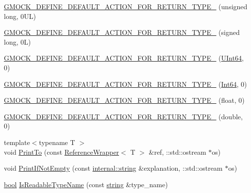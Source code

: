 \begin{DoxyCompactItemize}
\item 
\hyperlink{namespacetesting_1_1internal_a1f4167b954a7ff0074ce8a5bb855f86f}{G\+M\+O\+C\+K\+\_\+\+D\+E\+F\+I\+N\+E\+\_\+\+D\+E\+F\+A\+U\+L\+T\+\_\+\+A\+C\+T\+I\+O\+N\+\_\+\+F\+O\+R\+\_\+\+R\+E\+T\+U\+R\+N\+\_\+\+T\+Y\+P\+E\+\_\+} (unsigned long, 0\+U\+L)
\item 
\hyperlink{namespacetesting_1_1internal_ad8804e25537427755c324ab03a72e776}{G\+M\+O\+C\+K\+\_\+\+D\+E\+F\+I\+N\+E\+\_\+\+D\+E\+F\+A\+U\+L\+T\+\_\+\+A\+C\+T\+I\+O\+N\+\_\+\+F\+O\+R\+\_\+\+R\+E\+T\+U\+R\+N\+\_\+\+T\+Y\+P\+E\+\_\+} (signed long, 0\+L)
\item 
\hyperlink{namespacetesting_1_1internal_ad2efcdbd12c7c020745b87bcc0997809}{G\+M\+O\+C\+K\+\_\+\+D\+E\+F\+I\+N\+E\+\_\+\+D\+E\+F\+A\+U\+L\+T\+\_\+\+A\+C\+T\+I\+O\+N\+\_\+\+F\+O\+R\+\_\+\+R\+E\+T\+U\+R\+N\+\_\+\+T\+Y\+P\+E\+\_\+} (\hyperlink{namespacetesting_1_1internal_aa6a1ac454e6d7e550fa4925c62c35caa}{U\+Int64}, 0)
\item 
\hyperlink{namespacetesting_1_1internal_ab427739121a380a7934bda96153f053d}{G\+M\+O\+C\+K\+\_\+\+D\+E\+F\+I\+N\+E\+\_\+\+D\+E\+F\+A\+U\+L\+T\+\_\+\+A\+C\+T\+I\+O\+N\+\_\+\+F\+O\+R\+\_\+\+R\+E\+T\+U\+R\+N\+\_\+\+T\+Y\+P\+E\+\_\+} (\hyperlink{namespacetesting_1_1internal_a271c563fec38b804ddab0677f51f70a8}{Int64}, 0)
\item 
\hyperlink{namespacetesting_1_1internal_a71c697e5b567365fd3ff6c720769633b}{G\+M\+O\+C\+K\+\_\+\+D\+E\+F\+I\+N\+E\+\_\+\+D\+E\+F\+A\+U\+L\+T\+\_\+\+A\+C\+T\+I\+O\+N\+\_\+\+F\+O\+R\+\_\+\+R\+E\+T\+U\+R\+N\+\_\+\+T\+Y\+P\+E\+\_\+} (float, 0)
\item 
\hyperlink{namespacetesting_1_1internal_a7ba92aa33f4968c902623cd02e445020}{G\+M\+O\+C\+K\+\_\+\+D\+E\+F\+I\+N\+E\+\_\+\+D\+E\+F\+A\+U\+L\+T\+\_\+\+A\+C\+T\+I\+O\+N\+\_\+\+F\+O\+R\+\_\+\+R\+E\+T\+U\+R\+N\+\_\+\+T\+Y\+P\+E\+\_\+} (double, 0)
\item 
{\footnotesize template$<$typename T $>$ }\\void \hyperlink{namespacetesting_1_1internal_a8fd10cc30084c36a89c74868c8bd53f8}{Print\+To} (const \hyperlink{classtesting_1_1internal_1_1ReferenceWrapper}{Reference\+Wrapper}$<$ T $>$ \&ref, \+::std\+::ostream $\ast$os)
\item 
void \hyperlink{namespacetesting_1_1internal_afa4cd5d7933878d6d820b32c87bb2767}{Print\+If\+Not\+Empty} (const \hyperlink{namespacetesting_1_1internal_a8e8ff5b11e64078831112677156cb111}{internal\+::string} \&explanation, \+::std\+::ostream $\ast$os)
\item 
\hyperlink{classbool}{bool} \hyperlink{namespacetesting_1_1internal_a19a5d50382569ce6ee94e2b68ddc6fc7}{Is\+Readable\+Type\+Name} (const \hyperlink{namespacetesting_1_1internal_a8e8ff5b11e64078831112677156cb111}{string} \&type\+\_\+name)

\end{DoxyCompactItemize}
